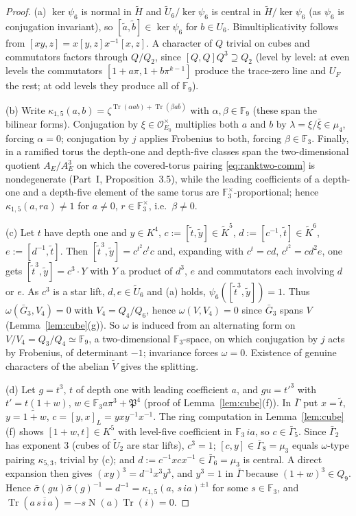 \documentclass[11pt]{article}
\newcommand{\Fq}{\mathbb F}
\newcommand{\Nm}{\operatorname N}
\newcommand{\Tr}{\operatorname{Tr}}
\newcommand{\tH}{\widetilde H}
\newcommand{\tU}{\widetilde U}
\newcommand{\tV}{\widetilde V}
\newcommand{\Ocal}{\mathcal O}
\newcommand{\Pfr}{\mathfrak P}
\theoremstyle{plain}
\theoremstyle{definition}
\begin{document}
\begin{proof}
(a) $\ker\psi_6$ is normal in $\tH$ and $\tU_6/\ker\psi_6$ is central
in $\tH/\ker\psi_6$ (as $\psi_6$ is conjugation invariant), so
$[\tilde a,\tilde b]\in\ker\psi_6$ for $b\in U_6$.  Bimultiplicativity
follows from $[xy,z]=x[y,z]x^{-1}[x,z]$.  A character of $Q$ trivial on
cubes and commutators factors through $Q/Q_2$, since
$[Q,Q]Q^3\supseteq Q_2$ (level by level: at even levels the commutators
$[1+a\pi,1+b\pi^{k-1}]$ produce the trace-zero line and $U_F$ the rest;
at odd levels they produce all of $\Fq_9$).

(b) Write $\kappa_{1,5}(a,b)=\zeta^{\Tr(\alpha ab)+\Tr(\beta a\bar b)}$ with
$\alpha,\beta\in\Fq_9$ (these span the bilinear forms).  Conjugation
by $\xi\in\Ocal_{E_0}^\times$ multiplies both $a$ and $b$ by
$\lambda=\xi/\bar\xi\in\mu_4$, forcing $\alpha=0$; conjugation by $j$
applies Frobenius to both, forcing $\beta\in\Fq_3$.  Finally, in a
ramified torus the depth-one and depth-five classes span the
two-dimensional quotient $A_E/A_E^3$ on which the covered-torus pairing
\eqref{eq:ranktwo-comm} is nondegenerate (Part~I, Proposition~3.5),
while the leading coefficients of a depth-one and a depth-five element
of the same torus are $\Fq_3^\times$-proportional; hence
$\kappa_{1,5}(a,ra)\ne1$ for $a\ne0$, $r\in\Fq_3^\times$, i.e.\ $\beta\ne0$.

(c) Let $t$ have depth one and $y\in K^4$, $c:=[\tilde t,\tilde y]\in\tilde K^5$,
$d:=[c^{-1},\tilde t]\in\tilde K^6$, $e:=[d^{-1},\tilde t]$.  Then
$[\tilde t^3,\tilde y]=c^{t^2}c^{t}c$ and, expanding with $c^t=cd$,
$c^{t^2}=cd^2e$, one gets $[\tilde t^3,\tilde y]=c^3\cdot Y$ with $Y$ a
product of $d^3$, $e$ and commutators each involving $d$ or $e$.  As
$c^3$ is a star lift, $d,e\in\tU_6$ and (a) holds, $\psi_6([\tilde t^3,\tilde y])=1$.
Thus $\omega(\bar G_3,V_4)=0$ with $V_4=Q_4/Q_6$, hence $\omega(V,V_4)=0$
since $\bar G_3$ spans $V$ (Lemma~\ref{lem:cube}(g)).  So $\omega$ is
induced from an alternating form on $V/V_4=Q_3/Q_4\simeq\Fq_9$, a
two-dimensional $\Fq_3$-space, on which conjugation by $j$ acts by
Frobenius, of determinant $-1$; invariance forces $\omega=0$.
Existence of genuine characters of the abelian $\tV$ gives the splitting.

(d) Let $g=t^3$, $t$ of depth one with leading coefficient $a$, and
$gu=t'^3$ with $t'=t(1+w)$, $w\in\Fq_3a\pi^3+\Pfr^4$
(proof of Lemma~\ref{lem:cube}(f)).  In $\bar\Gamma$ put $x=\tilde t$,
$y=\widetilde{1+w}$, $c=[y,x]_L=yxy^{-1}x^{-1}$.  The ring computation
in Lemma~\ref{lem:cube}(f) shows $[1+w,t]\in K^5$ with level-five
coefficient in $\Fq_3\,ia$, so $c\in\bar\Gamma_5$.  Since $\bar\Gamma_2$
has exponent $3$ (cubes of $\tU_2$ are star lifts), $c^3=1$;
$[c,y]\in\bar\Gamma_8=\mu_3$ equals $\omega$-type pairing $\kappa_{5,3}$,
trivial by (c); and $d:=c^{-1}xcx^{-1}\in\bar\Gamma_6=\mu_3$ is central.
A direct expansion then gives $(xy)^3=d^{-1}x^3y^3$, and $y^3=1$ in
$\bar\Gamma$ because $(1+w)^3\in Q_9$.  Hence
$\bar\sigma(gu)\bar\sigma(g)^{-1}=d^{-1}=\kappa_{1,5}(a,\,s\,ia)^{\pm1}$
for some $s\in\Fq_3$, and $\Tr(a\,\overline{s\,i\,a})=-s\Nm(a)\Tr(i)=0$.
\end{proof}
\end{document}
